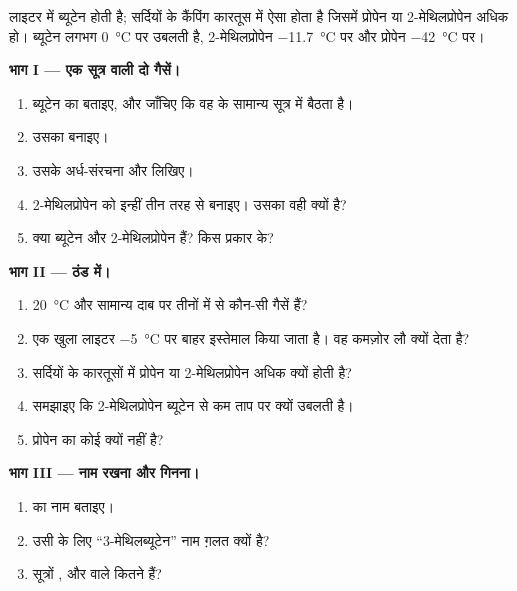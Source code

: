 \begin{problem}
\label{pb:g11:organic-skeletons:1}
लाइटर में ब्यूटेन होती है; सर्दियों के कैंपिंग कारतूस में ऐसा  होता है जिसमें
प्रोपेन या 2-मेथिलप्रोपेन अधिक हो। ब्यूटेन लगभग
\qty{0}{\celsius} पर उबलती है, 2-मेथिलप्रोपेन \qty{-11.7}{\celsius} पर और प्रोपेन
\qty{-42}{\celsius} पर।

\medskip
\noindent\textbf{भाग I --- एक सूत्र वाली दो गैसें।}
\begin{enumerate}
  \item ब्यूटेन का  बताइए, और जाँचिए कि वह  के
        सामान्य सूत्र में बैठता है।
  \item उसका  बनाइए।
  \item उसके अर्ध-संरचना और  लिखिए।
  \item 2-मेथिलप्रोपेन को इन्हीं तीन तरह से बनाइए। उसका 
        वही क्यों है?
  \item क्या ब्यूटेन और 2-मेथिलप्रोपेन  हैं? किस प्रकार के?
\end{enumerate}

\medskip
\noindent\textbf{भाग II --- ठंड में।}
\begin{enumerate}[resume]
  \item \qty{20}{\celsius} और सामान्य दाब पर तीनों में से कौन-सी
        गैसें हैं?
  \item एक खुला लाइटर \qty{-5}{\celsius} पर बाहर इस्तेमाल किया जाता है। वह
        कमज़ोर लौ क्यों देता है?
  \item सर्दियों के कारतूसों में प्रोपेन या 2-मेथिलप्रोपेन अधिक क्यों होती है?
  \item समझाइए कि 2-मेथिलप्रोपेन ब्यूटेन से कम ताप पर क्यों उबलती है।
  \item प्रोपेन का कोई  क्यों नहीं है?
\end{enumerate}

\medskip
\noindent\textbf{भाग III --- नाम रखना और गिनना।}
\begin{enumerate}[resume]
  \item {} का नाम बताइए।
  \item उसी  के लिए ``3-मेथिलब्यूटेन'' नाम ग़लत क्यों है?
  \item सूत्रों ,
         और  वाले कितने   हैं?
\end{enumerate}


\end{problem}
